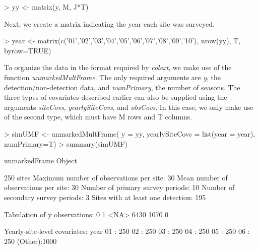 \documentclass[12pt]{article}
\renewenvironment{Schunk}{\vspace{\topsep}}{\vspace{\topsep}}
\begin{document}
\begin{small}
\begin{Schunk}
\begin{Sinput}
> yy <- matrix(y, M, J*T)
\end{Sinput}
\end{Schunk}
\end{small}


Next, we create a matrix indicating the year each site was surveyed.

\begin{small}
\begin{Schunk}
\begin{Sinput}
> year <- matrix(c('01','02','03','04','05','06','07','08','09','10'),
                nrow(yy), T, byrow=TRUE)
\end{Sinput}
\end{Schunk}
\end{small}

To organize the data in the format required by \emph{colext}, we make
use of the function \emph{unmarkedMultFrame}. The only required
arguments are \emph{y}, the detection/non-detection data, and
\emph{numPrimary}, the number of seasons. The three types of
covariates described earlier can also be supplied using the arguments
\emph{siteCovs}, \emph{yearlySiteCovs}, and \emph{obsCovs}. In this case,
we only make use of the second type, which must have M rows and T
columns.

\begin{small}

\begin{Schunk}
\begin{Sinput}
> simUMF <- unmarkedMultFrame(
     y = yy,
     yearlySiteCovs = list(year = year),
     numPrimary=T)
> summary(simUMF)
\end{Sinput}
\begin{Soutput}
unmarkedFrame Object

250 sites
Maximum number of observations per site: 30 
Mean number of observations per site: 30 
Number of primary survey periods: 10 
Number of secondary survey periods: 3 
Sites with at least one detection: 195 

Tabulation of y observations:
   0    1 <NA> 
6430 1070    0 

Yearly-site-level covariates:
      year     
 01     : 250  
 02     : 250  
 03     : 250  
 04     : 250  
 05     : 250  
 06     : 250  
 (Other):1000  
\end{Soutput}
\end{Schunk}
\end{small}
\end{document}
